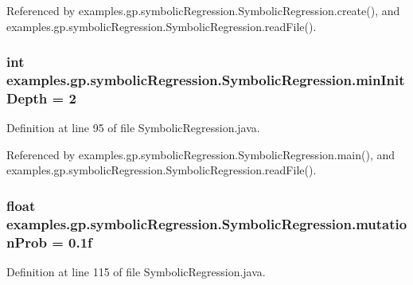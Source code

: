 Referenced by examples.\-gp.\-symbolic\-Regression.\-Symbolic\-Regression.\-create(), and examples.\-gp.\-symbolic\-Regression.\-Symbolic\-Regression.\-read\-File().

\hypertarget{classexamples_1_1gp_1_1symbolic_regression_1_1_symbolic_regression_ab349b6e3c7f332656dd27d97984bc7cc}{
\subsubsection[{min\-Init\-Depth}]{\setlength{\rightskip}{0pt plus 5cm}int examples.\-gp.\-symbolic\-Regression.\-Symbolic\-Regression.\-min\-Init\-Depth = 2\hspace{0.3cm}{\ttfamily [static]}}}\label{classexamples_1_1gp_1_1symbolic_regression_1_1_symbolic_regression_ab349b6e3c7f332656dd27d97984bc7cc}


Definition at line 95 of file Symbolic\-Regression.\-java.



Referenced by examples.\-gp.\-symbolic\-Regression.\-Symbolic\-Regression.\-main(), and examples.\-gp.\-symbolic\-Regression.\-Symbolic\-Regression.\-read\-File().

\hypertarget{classexamples_1_1gp_1_1symbolic_regression_1_1_symbolic_regression_a42b4986cf46bee051208305bd6d73267}{
\subsubsection[{mutation\-Prob}]{\setlength{\rightskip}{0pt plus 5cm}float examples.\-gp.\-symbolic\-Regression.\-Symbolic\-Regression.\-mutation\-Prob = 0.\-1f\hspace{0.3cm}{\ttfamily [static]}}}\label{classexamples_1_1gp_1_1symbolic_regression_1_1_symbolic_regression_a42b4986cf46bee051208305bd6d73267}


Definition at line 115 of file Symbolic\-Regression.\-java.



